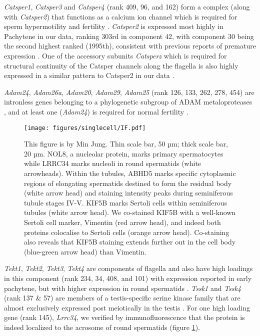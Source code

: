 \textit{Catsper1}, \textit{Catsper3} and \textit{Catsper4} (rank 409, 96, and 162) form a complex (along with \textit{Catsper2}) that functions as a calcium ion channel which is required for sperm hypermotility and fertility \parencite{Ren2001sperm, Lobley2003Identification, Qi2007All, Jin2007Catsper3}. \textit{Catsper2} is expressed most highly in Pachytene in our data, ranking 303rd in component 42, with component 30 being the second highest ranked (1995th), consistent with previous reports of premature expression \parencite{Schultz2003multitude}. One of the accessory subunits \textit{Catsperz} which is required for structural continuity of the Catsper channels along the flagella is also highly expressed in a similar pattern to Catsper2 in our data \parencite{Chung2017CatSperz}.

\textit{Adam24}, \textit{Adam26a}, \textit{Adam20}, \textit{Adam29}, \textit{Adam25} (rank 126, 133, 262, 278, 454) are intronless genes belonging to a phylogenetic subgroup of ADAM metaloproteases \parencite{Choi2004Characterization}, and at least one (\textit{Adam24}) is required for normal fertility \parencite{Zhu2009Testase}.


\begin{figure}[H]
	\centering
	\texttt{[image: figures/singlecell/IF.pdf]}
	\caption[Novel Immunofluorescence Markers]{
		This figure is by Min Jung. Thin scale bar, 50 µm; thick scale bar, 20 µm.
		NOL8, a nucleolar protein, marks primary spermatocytes while LRRC34 marks nucleoli in round spermatids (white arrowheads).
		Within the tubules, ABHD5 marks specific cytoplasmic regions of elongating spermatids destined to form the residual body (white arrow head) and staining intensity peaks during seminiferous tubule stages IV-V.
		KIF5B marks Sertoli cells within seminiferous tubules (white arrow head). We co-stained KIF5B with a well-known Sertoli cell marker, Vimentin (red arrow head), and indeed both proteins colocalise to Sertoli cells (orange arrow head). Co-staining also reveals that KIF5B staining extends further out in the cell body (blue-green arrow head) than Vimentin.
	}
	\label{fig:IF}
\end{figure}


\textit{Tekt1}, \textit{Tekt2}, \textit{Tekt3}, \textit{Tekt4} are components of flagella \parencite{Amos2008tektin} and also have high loadings in this component (rank 234, 34, 408, and 101) with expression reported in early pachytene, but with higher expression in round spermatids \parencite{Fallahi2010Global}. \textit{Tssk1} and \textit{Tssk4} (rank 137 \& 57) are members of a testis-specific serine kinase family that are almost exclusively expressed post meiotically in the testis \parencite{Li2011Expression}. For one high loading gene (rank 145), \textit{Lrrc34}, we verified by immunofluorescence that the protein is indeed localized to the acrosome of round spermatids (figure \ref{fig:IF}). 

